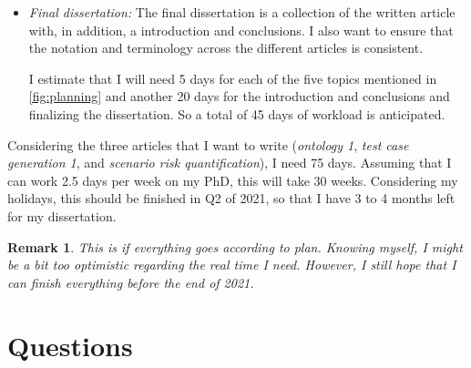 \documentclass[10pt,final,a4paper,oneside,onecolumn]{article}
\newtheorem*{remark*}{Remark}
\begin{document}
\begin{itemize}
	\item \textit{Final dissertation:} The final dissertation is a collection of the written article with, in addition, a introduction and conclusions. I also want to ensure that the notation and terminology across the different articles is consistent. 
	
	I estimate that I will need 5 days for each of the five topics mentioned in \cref{fig:planning} and another 20 days for the introduction and conclusions and finalizing the dissertation. So a total of 45 days of workload is anticipated.
\end{itemize}

Considering the three articles that I want to write (\textit{ontology 1}, \textit{test case generation 1}, and \textit{scenario risk quantification}), I need 75 days. Assuming that I can work 2.5 days per week on my PhD, this will take 30 weeks. Considering my holidays, this should be finished in Q2 of 2021, so that I have 3 to 4 months left for my dissertation. 

\begin{remark*}
	This is if everything goes according to plan. Knowing myself, I might be a bit too optimistic regarding the real time I need. However, I still hope that I can finish everything before the end of 2021.
\end{remark*}

\section{Questions}
\end{document}
